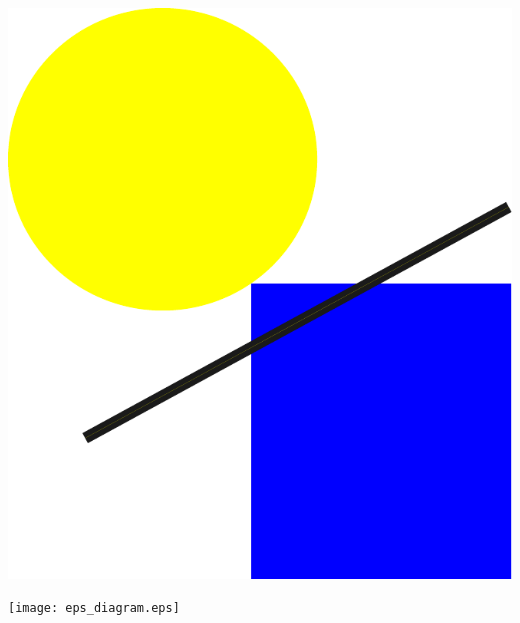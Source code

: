\documentclass{article}
\begin{document}
\includegraphics{pdf_diagram.pdf}

\texttt{[image: eps\_diagram.eps]}
\end{document}
